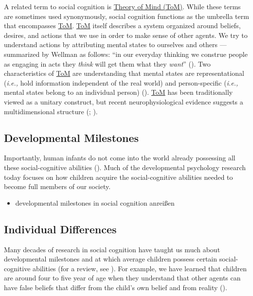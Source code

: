 \documentclass[
]{scrbook}
\providecommand{\tightlist}{%
  \setlength{\itemsep}{0pt}\setlength{\parskip}{0pt}}
\begin{document}
A related term to social cognition is \hyperref[acronyms_ToM]{Theory of Mind (ToM)}. While these terms are sometimes used synonymously, social cognition functions as the umbrella term that encompasses \hyperref[acronyms_ToM]{ToM}. \hyperref[acronyms_ToM]{ToM} itself describes a system organized around beliefs, desires, and actions that we use in order to make sense of other agents. We try to understand actions by attributing mental states to ourselves and others --- summarized by Wellman as follows: ``in our everyday thinking we construe people as engaging in acts they \emph{think} will get them what they \emph{want}'' (). Two characteristics of \hyperref[acronyms_ToM]{ToM} are understanding that mental states are representational (\emph{i.e.,} hold information independent of the real world) and person-specific (\emph{i.e.,} mental states belong to an individual person) (). \hyperref[acronyms_ToM]{ToM} has been traditionally viewed as a unitary construct, but recent neurophysiological evidence suggests a multidimensional structure (; ).

\subsection{Developmental Milestones}\label{developmental-milestones}

Importantly, human infants do not come into the world already possessing all these social-cognitive abilities (). Much of the developmental psychology research today focuses on how children acquire the social-cognitive abilities needed to become full members of our society.

\begin{itemize}
\tightlist
\item
  developmental milestones in social cognition anreißen
\end{itemize}

\subsection{Individual Differences}\label{individual-differences}

Many decades of research in social cognition have taught us much about developmental milestones and at which average children possess certain social-cognitive abilities (for a review, see ). For example, we have learned that children are around four to five year of age when they understand that other agents can have false beliefs that differ from the child's own belief and from reality ().
\end{document}

